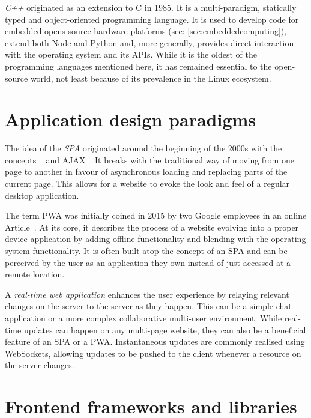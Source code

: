 \emph{C++} originated as an extension to C in 1985.
It is a multi-paradigm, statically typed and object-oriented programming language.
It is used to develop code for embedded opens-source hardware platforms (see: \autoref{sec:embeddedcomputing}), extend both Node and Python and, more generally, provides direct interaction with the operating system and its APIs. While it is the oldest of the programming languages mentioned here, it has remained essential to the open-source world, not least because of its prevalence in the Linux ecosystem.


\section{Application design paradigms}
\label{sec:application-design-paradigms}

The idea of the \emph{\ac{SPA}} originated around the beginning of the 2000s with the concepts ~\parencite{innerBrowsing} and \ac{AJAX}~\parencite{ajaxNewApproach}.
It breaks with the traditional way of moving from one page to another in favour of asynchronous loading and replacing parts of the current page.
This allows for a website to evoke the look and feel of a regular desktop application.

The term \ac{PWA} was initially coined in 2015 by two Google employees in an online Article~\parencite{progressiveWebApplications}.
At its core, it describes the process of a website  evolving into a proper device application by adding offline functionality and blending with the operating system functionality.
It is often built atop the concept of an \ac{SPA} and can be perceived by the user as an application they own instead of just accessed at a remote location.

A \emph{real-time web application} enhances the user experience by relaying relevant changes on the server to the server as they happen.
This can be a simple chat application or a more complex collaborative multi-user environment.
While real-time updates can happen on any multi-page website, they can also be a beneficial feature of an \ac{SPA} or a \ac{PWA}.
Instantaneous updates are commonly realised using WebSockets, allowing updates to be pushed to the client whenever a resource on the server changes.


\section{Frontend frameworks and libraries}
\label{sec:frontend-frameworks-and-libraries}

